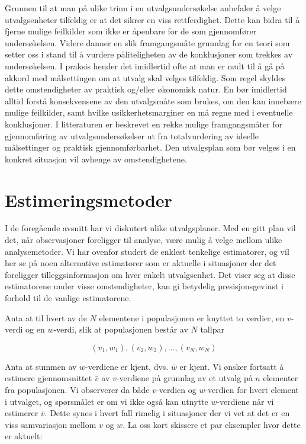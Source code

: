 Grunnen til at man på ulike trinn i en utvalgsundersøkelse anbefaler
å velge utvalgsenheter tilfeldig er at det sikrer en viss rettferdighet.
Dette kan bidra til å fjerne mulige feilkilder som ikke er åpenbare
for de som gjennomfører undersøkelsen.  Videre danner en slik 
framgangsmåte grunnlag for en teori som setter oss i stand til å
vurdere påliteligheten av de konklusjoner som trekkes av undersøkelsen.
I praksis hender det imidlertid ofte at man er nødt til å gå på
akkord med målsettingen om at utvalg skal velges tilfeldig.  Som regel
skyldes dette omstendigheter av praktisk og/eller økonomisk natur.  En 
bør imidlertid alltid forstå konsekvensene av den utvalgsmåte som
brukes, om den kan innebære mulige feilkilder, samt hvilke 
usikkerhetsmarginer en må regne med i eventuelle konklusjoner.  I 
litteraturen er beskrevet en rekke mulige framgangsmåter for
gjennomføring av utvalgs\-under\-søkelser ut fra totalvurdering av ideelle
målsettinger og praktisk gjennomførbarhet.  Den utvalgsplan som bør
velges i en konkret situasjon vil avhenge av omstendighetene.


\section{Estimeringsmetoder}

I de foregående avsnitt har vi diskutert ulike utvalgsplaner.  Med en gitt
plan vil det, når observasjoner foreligger til analyse, være mulig
å velge mellom ulike analysemetoder.  Vi har ovenfor studert de enklest
tenkelige estimatorer, og vil her se på noen alternative estimatorer som
er aktuelle i situasjoner der det foreligger tilleggsinformasjon om hver 
enkelt utvalgsenhet.  Det viser seg at disse estimatorene under visse 
omstendigheter, kan gi betydelig presisjonsgevinst i forhold til de vanlige 
estimatorene.

Anta at til hvert av de $N$ elementene i populasjonen er knyttet to verdier,
en $v$-verdi og en $w$-verdi, slik at populasjonen består av $N$ tallpar

\[ (v_1,w_1),(v_2,w_2),\ldots ,(v_N,w_N) \]

\noindent Anta at summen av $w$-verdiene er kjent, dvs. $\bar{w}$ er kjent. Vi
ønsker fortsatt å estimere gjennomsnittet $\bar{v}$ av $v$-verdiene
på grunnlag av et utvalg på $n$ elementer fra populasjonen.  Vi
observerer da både $v$-verdien og $w$-verdien for hvert element i 
utvalget, og spørsmålet er om vi ikke også kan utnytte $w$-verdiene
når vi estimerer $\bar{v}$.  Dette synes i hvert fall rimelig i 
situasjoner der vi vet at det er en viss samvariasjon mellom $v$ og $w$.  La
oss kort skissere et par eksempler hvor dette er aktuelt:

